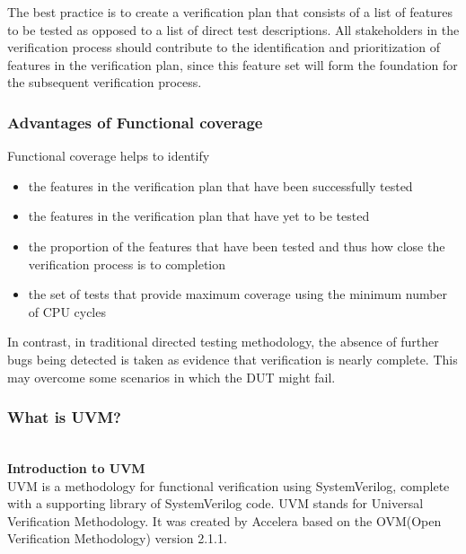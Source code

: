 \documentclass[a4paper,11pt]{article}
\begin{document}
The best practice is to create a verification plan that consists of a list of features to be tested as opposed to a list of direct test descriptions. All stakeholders in the verification process should contribute to the identification and prioritization of features in the verification plan, since this feature set will form the foundation for the subsequent verification process.

\subsubsection{Advantages of Functional coverage}
Functional coverage helps to identify

\begin{itemize}[noitemsep]
\item the features in the verification plan that have been successfully tested
\item the features in the verification plan that have yet to be tested
\item the proportion of the features that have been tested and thus how close the verification process is to completion
\item the set of tests that provide maximum coverage using the minimum number of CPU cycles
\end{itemize}

In contrast, in traditional directed testing methodology, the absence of further bugs being detected is taken as evidence that verification is nearly complete. This may overcome some scenarios in which the DUT might fail.

\subsubsection{What is UVM?}
\ \\ 
\textbf{Introduction to UVM}
\ \\
UVM is a methodology for functional verification using SystemVerilog, complete with a supporting library of SystemVerilog code. UVM stands for Universal Verification Methodology. It was created by Accelera based on the OVM(Open Verification Methodology) version 2.1.1.
\end{document}
